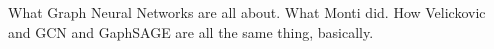 \label{chapter:introduction}

What Graph Neural Networks are all about. What Monti did. How Velickovic and GCN and GaphSAGE are all the same thing, basically.
